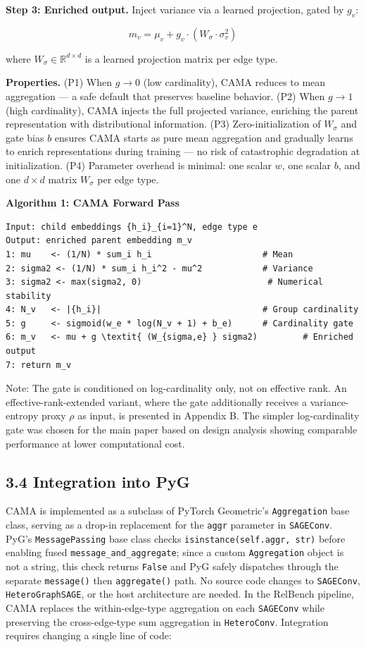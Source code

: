 \documentclass[final]{article}
\begin{document}
\textbf{Step 3: Enriched output.} Inject variance via a learned projection, gated by $g_v$:

$$m_v = \mu_v + g_v \cdot (W_\sigma \cdot \sigma_v^2)$$

where $W_\sigma \in \mathbb{R}^{d \times d}$ is a learned projection matrix per edge type.

\textbf{Properties.} (P1) When $g \to 0$ (low cardinality), CAMA reduces to mean aggregation --- a safe default that preserves baseline behavior. (P2) When $g \to 1$ (high cardinality), CAMA injects the full projected variance, enriching the parent representation with distributional information. (P3) Zero-initialization of $W_\sigma$ and gate bias $b$ ensures CAMA starts as pure mean aggregation and gradually learns to enrich representations during training --- no risk of catastrophic degradation at initialization. (P4) Parameter overhead is minimal: one scalar $w$, one scalar $b$, and one $d \times d$ matrix $W_\sigma$ per edge type.

\textbf{Algorithm 1: CAMA Forward Pass}
\begin{verbatim}
Input: child embeddings {h_i}_{i=1}^N, edge type e
Output: enriched parent embedding m_v
1: mu    <- (1/N) * sum_i h_i                      # Mean
2: sigma2 <- (1/N) * sum_i h_i^2 - mu^2            # Variance
3: sigma2 <- max(sigma2, 0)                         # Numerical stability
4: N_v   <- |{h_i}|                                # Group cardinality
5: g     <- sigmoid(w_e * log(N_v + 1) + b_e)      # Cardinality gate
6: m_v   <- mu + g \textit{ (W_{sigma,e} } sigma2)         # Enriched output
7: return m_v
\end{verbatim}

Note: The gate is conditioned on log-cardinality only, not on effective rank. An effective-rank-extended variant, where the gate additionally receives a variance-entropy proxy $\rho$ as input, is presented in Appendix B. The simpler log-cardinality gate was chosen for the main paper based on design analysis showing comparable performance at lower computational cost.

\subsection{3.4 Integration into PyG}

CAMA is implemented as a subclass of PyTorch Geometric's \texttt{Aggregation} base class, serving as a drop-in replacement for the \texttt{aggr} parameter in \texttt{SAGEConv}. PyG's \texttt{MessagePassing} base class checks \texttt{isinstance(self.aggr, str)} before enabling fused \texttt{message_and_aggregate}; since a custom \texttt{Aggregation} object is not a string, this check returns \texttt{False} and PyG safely dispatches through the separate \texttt{message()} then \texttt{aggregate()} path. No source code changes to \texttt{SAGEConv}, \texttt{HeteroGraphSAGE}, or the host architecture are needed. In the RelBench pipeline, CAMA replaces the within-edge-type aggregation on each \texttt{SAGEConv} while preserving the cross-edge-type sum aggregation in \texttt{HeteroConv}. Integration requires changing a single line of code:
\end{document}

